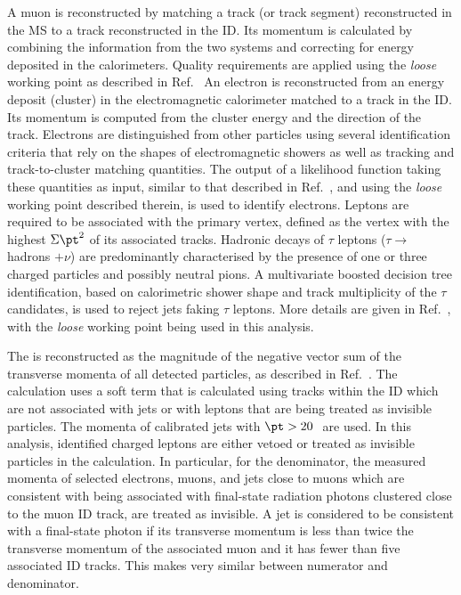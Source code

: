 \documentclass[cernpreprint,txfonts,UKenglish,texlive=2016]{\ATLASLATEXPATH atlasdoc}
\begin{document}
A muon is reconstructed by matching a track (or track segment)
reconstructed in the MS to
a track reconstructed in the ID.  
Its momentum is calculated
by combining the information from the two systems and correcting for energy deposited in the
calorimeters. 
Quality requirements are applied using the \emph{loose} working point as described in Ref.~\cite{PERF-2015-10}
An electron is reconstructed from an energy deposit (cluster) in the
electromagnetic calorimeter matched to a track in the ID. Its momentum
is computed from the cluster  energy and
the direction of the track.
Electrons are distinguished from other particles using several
identification criteria that rely on the shapes of electromagnetic
showers as well as tracking and track-to-cluster matching
quantities. The output of a likelihood function taking these
quantities as input, similar to that
described in  Ref.~\cite{PERF-2016-01}, and using the \emph{loose}
working point described therein, is used to identify
electrons. 
Leptons are required to be
associated with the primary vertex, defined as the vertex with the
highest $\Sigma\pt^2$ of its associated tracks.
Hadronic decays of $\tau$ leptons ($\tau \to$ hadrons $+ \nu$) are predominantly characterised by the presence 
of one or three charged particles and possibly neutral pions.
A multivariate boosted decision tree  identification, based on
calorimetric shower shape and track multiplicity of the $\tau$ candidates, 
is used to reject jets faking $\tau$ leptons. More details are
given in Ref.~\cite{ATL-PHYS-PUB-2015-045}, with the \emph{loose} working point being
used in this analysis.

The \ptmiss{} is reconstructed as the magnitude of the negative vector
sum of the transverse momenta of all detected particles, as described in Ref.~\cite{PERF-2014-04}. 
The  \ptmiss{} calculation uses a soft term that is calculated using tracks
within the ID which are not associated with jets or with leptons that
are being treated as invisible particles.
The momenta of calibrated jets with 
$\pt > 20$\,\GeV\ are used. 
In this analysis, identified charged leptons
are either vetoed or treated as invisible particles in the \ptmiss{}
calculation. In particular, for the \lljet{} denominator, the measured momenta of selected
electrons, muons, and jets close to muons which are consistent with
being associated with final-state radiation photons clustered close to the
muon ID track, are treated as invisible. A jet is considered to be consistent with a
final-state photon if its transverse momentum is less than twice the
transverse momentum of the associated muon and it has fewer than five
associated ID tracks.
This makes \ptmiss{} very similar  between numerator and denominator. 
\end{document}
